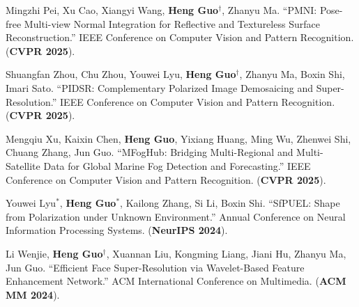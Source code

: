 \documentclass[UTF8]{ctexart}
\begin{document}
\begin{enumerate}[label={[\arabic*]}]
	\item Mingzhi Pei, Xu Cao, Xiangyi Wang, \textbf{Heng Guo}$^\dagger$, Zhanyu Ma. ``PMNI: Pose-free Multi-view Normal Integration for Reflective and Textureless Surface Reconstruction.'' IEEE Conference on Computer Vision and Pattern Recognition. (\textbf{CVPR 2025}).
	\item Shuangfan Zhou, Chu Zhou, Youwei Lyu, \textbf{Heng Guo}$^\dagger$, Zhanyu Ma, Boxin Shi, Imari Sato. ``PIDSR: Complementary Polarized Image Demosaicing and Super-Resolution.'' IEEE Conference on Computer Vision and Pattern Recognition. (\textbf{CVPR 2025}).
	\item Mengqiu Xu, Kaixin Chen, \textbf{Heng Guo}, Yixiang Huang, Ming Wu, Zhenwei Shi, Chuang Zhang, Jun Guo. ``MFogHub: Bridging Multi-Regional and Multi-Satellite Data for Global Marine Fog Detection and Forecasting.'' IEEE Conference on Computer Vision and Pattern Recognition. (\textbf{CVPR 2025}).
	\item Youwei Lyu$^*$, \textbf{Heng Guo}$^*$, Kailong Zhang, Si Li, Boxin Shi. ``SfPUEL: Shape from Polarization under Unknown Environment.'' Annual Conference on Neural Information Processing Systems. (\textbf{NeurIPS 2024}).
	\item Li Wenjie, \textbf{Heng Guo}$^\dagger$, Xuannan Liu, Kongming Liang, Jiani Hu, Zhanyu Ma, Jun Guo. ``Efficient Face Super-Resolution via Wavelet-Based Feature Enhancement Network.'' ACM International Conference on Multimedia. (\textbf{ACM MM 2024}).
	

\end{enumerate}
\end{document}
